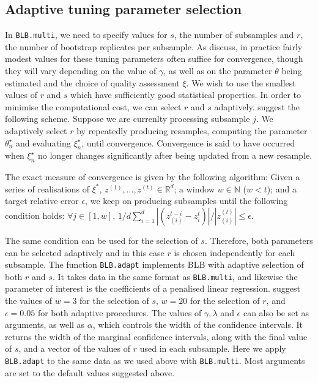 \documentclass{article}\usepackage[]{graphicx}\usepackage[]{color}
\begin{document}
\subsection{Adaptive tuning parameter selection}
In \texttt{BLB.multi}, we need to specify values for $s$, the number of subsamples and $r$, the number of bootstrap replicates per subsample. As \textcite{Kleiner2014} discuss, in practice fairly modest values for these tuning parameters often suffice for convergence, though they will vary depending on the value of $\gamma$, as well as on the parameter $\theta$ being estimated and the choice of quality assessment $\xi$. We wish to use the smallest values of $r$ and $s$ which have sufficiently good statistical properties. In order to minimise the computational cost, we can select $r$ and $s$ adaptively. \textcite{Kleiner2014} suggest the following scheme. Suppose we are currenlty processing subsample $j$. We adaptively select $r$ by repeatedly producing resamples, computing the parameter $\theta^{\star}_{n}$ and evaluating $\xi^{\star}_{n}$, until convergence. Convergence is said to have occurred when $\xi^{\star}_{n}$ no longer changes significantly after being updated from a new resample.

The exact measure of convergence is given by the following algorithm: Given a series of realisations of $\xi^*$, $ z^{(1)} ,..., z^{(t)}\in \mathbb{R}^{d}$; a window $w \in \mathbb{N}$ ($ w<t $); and a target relative error $\epsilon$,  we keep on producing subsamples until the following condition holds: $\forall j \in [1,w]$,
$ 1/d \sum_{i=1}^{d} | (z_{(i)}^{t-i}-z_{i}^{t}) | / |z_{(i)}^{(t)} | \leq \epsilon $.

The same condition can be used for the selection of $s$. Therefore, both parameters can be selected adaptively and in this case $r$ is chosen independently for each subsample. The function \texttt{BLB.adapt} implements BLB with adaptive selection of both $r$ and $s$. It takes data in the same format as \texttt{BLB.multi}, and likewise the parameter of interest is the coefficients of a penalised linear regression. \textcite{Kleiner2014} suggest the values of $w=3$ for the selection of $s$, $w=20$ for the selection of $r$, and $\epsilon=0.05$ for both adaptive procedures. The values of $\gamma, \lambda$ and $\epsilon$ can also be set as arguments, as well as $\alpha$, which controls the width of the confidence intervals. It returns the width of the marginal confidence intervals, along with the final value of $s$, and a vector of the values of $r$ used in each subsample. Here we apply \texttt{BLB.adapt} to the same data as we used above with \texttt{BLB.multi}. Most arguments are set to the default values suggested above.
\end{document}
